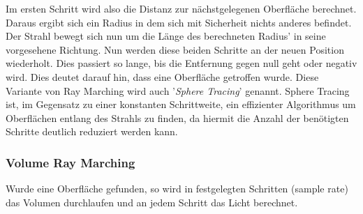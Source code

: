 Im ersten Schritt wird also die Distanz zur nächstgelegenen Oberfläche berechnet. Daraus ergibt sich ein Radius in dem sich 
mit Sicherheit nichts anderes befindet. Der Strahl bewegt sich nun um die Länge des berechneten Radius' in seine vorgesehene Richtung.
Nun werden diese beiden Schritte an der neuen Position wiederholt. Dies passiert so lange, bis die Entfernung gegen null geht oder negativ wird. 
Dies deutet darauf hin, dass eine Oberfläche getroffen wurde. Diese Variante von Ray Marching wird auch '\textit{Sphere Tracing}' genannt.
Sphere Tracing ist, im Gegensatz zu einer konstanten Schrittweite, ein effizienter Algorithmus um Oberflächen entlang des Strahls zu finden,
da hiermit die Anzahl der benötigten Schritte deutlich reduziert werden kann. 


\subsubsection{Volume Ray Marching}
Wurde eine Oberfläche gefunden, so wird in festgelegten Schritten (sample rate) das Volumen durchlaufen und an jedem Schritt das Licht berechnet.


